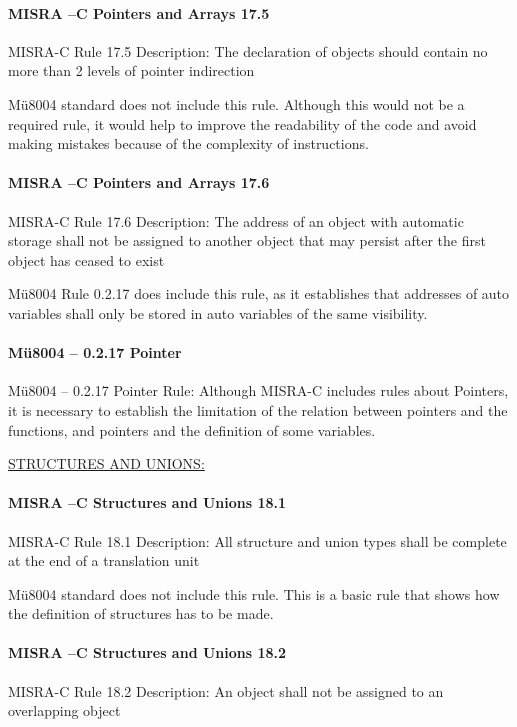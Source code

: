 \paragraph{MISRA –C Pointers and Arrays 17.5}
MISRA-C Rule 17.5 Description: The declaration of objects should contain no more than 2 levels of pointer indirection

Mü8004 standard does not include this rule. Although this would not be a required rule, it would help to improve the readability of the code and avoid making mistakes because of the complexity of instructions.

\paragraph{MISRA –C Pointers and Arrays 17.6}
MISRA-C Rule 17.6 Description: The address of an object with automatic storage shall not be assigned to another object that may persist after the first object has ceased to exist

Mü8004 Rule 0.2.17 does include this rule, as it establishes that addresses of auto variables shall only be stored in auto variables of the same visibility. 

\paragraph{Mü8004 – 0.2.17 Pointer}
Mü8004 – 0.2.17 Pointer Rule: Although MISRA-C includes rules about Pointers, it is necessary to establish the limitation of the relation between pointers and the functions, and pointers and the definition of some variables.

\begin{center}
\textsc{\underline{STRUCTURES AND UNIONS:}}
\end{center}

\paragraph{MISRA –C Structures and Unions 18.1}
MISRA-C Rule 18.1 Description: All structure and union types shall be complete at the end of a translation unit

Mü8004 standard does not include this rule. This is a basic rule that shows how the definition of structures has to be made.

\paragraph{MISRA –C Structures and Unions 18.2}
MISRA-C Rule 18.2 Description: An object shall not be assigned to an overlapping object

